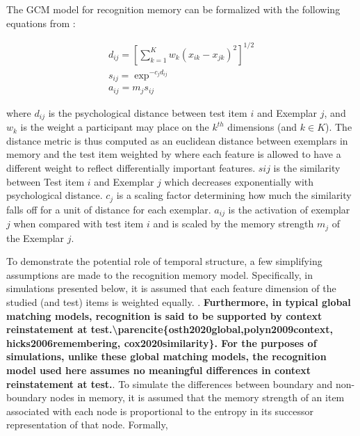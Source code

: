 The GCM model for recognition memory can be formalized with the following equations from \cite{nosofsky2011short}:

\begin{equation}
    \begin{aligned}
        d_{ij} = [\sum\limits_{k = 1}^K w_k(x_{ik} - x_{jk})^2]^{1/2} \\
        s_{ij} = \exp^{-c_jd_{ij}} \\
        a_{ij} = m_js_{ij}
    \end{aligned}
\end{equation}    

where $d_{ij}$ is the psychological distance between test item $i$ and Exemplar $j$, and $w_k$ is the weight a participant may place on the $k^{th}$ dimensions (and $k \in K$). The distance metric is thus computed as an euclidean distance between exemplars in memory and the test item weighted by where each feature is allowed to have a different weight to reflect differentially important features. $s{ij}$ is the similarity between Test item $i$ and Exemplar $j$ which decreases exponentially with psychological distance. $c_j$ is a scaling factor determining how much the similarity falls off for a unit of distance for each exemplar. $a_{ij}$ is the activation of exemplar $j$ when compared with test item $i$ and is scaled by the memory strength $m_j$ of the Exemplar $j$. 

To demonstrate the potential role of temporal structure, a few simplifying assumptions are made to the recognition memory model. Specifically, in simulations presented below, it is assumed that each feature dimension of the studied (and test) items is weighted equally. . \textbf{\ac{Furthermore, in typical global matching models, recognition is said to be supported by context reinstatement at test.\parencite{osth2020global,polyn2009context, hicks2006remembering, cox2020similarity}. For the purposes of simulations, unlike these global matching models, the recognition model used here assumes no meaningful differences in context reinstatement at test.}}. To simulate the differences between boundary and non-boundary nodes in memory, it is assumed that the memory strength of an item associated with each node is proportional to the entropy in its successor representation of that node. Formally, 


